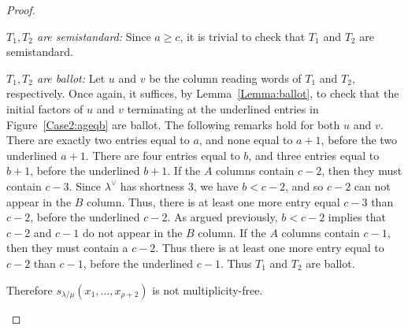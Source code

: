 \begin{proof}
\begin{Case}
\emph{$T_1,T_2$ are semistandard:} Since $a\geq c$, it is trivial to check that $T_1$ and $T_2$ are semistandard.

\emph{$T_1,T_2$ are ballot:} Let $u$ and $v$ be the column reading words of $T_1$ and $T_2$, respectively. Once again, it suffices, by Lemma~\ref{Lemma:ballot}, to check that the initial factors of $u$ and $v$ terminating at the underlined entries in Figure~\ref{Case2:ageqb} are ballot. The following remarks hold for both $u$ and $v$. There are exactly two entries equal to $a$, and none equal to $a+1$, before the two underlined $a+1$. There are four entries equal to $b$, and three entries equal to $b+1$, before the underlined $b+1$. If the $A$ columns contain $c-2$, then they must contain $c-3$. Since $\lambda^{\vee}$ has shortness $3$, we have $b < c-2$, and so $c-2$ can not appear in the $B$ column. Thus, there is at least one more entry equal $c-3$ than $c-2$, before the underlined $c-2$. As argued previously, $b < c-2$ implies that $c-2$ and $c-1$ do not appear in the $B$ column. If the $A$ columns contain $c-1$, then they must contain a $c-2$. Thus there is at least one more entry equal to $c-2$ than $c-1$, before the underlined $c-1$. Thus $T_1$ and $T_2$ are ballot. 

Therefore $s_{\lambda/\mu}(x_1,\ldots,x_{\rho+2})$ is not multiplicity-free.

\begin{figure}[htb]\centering
\end{figure}
\end{Case}
\end{proof}
